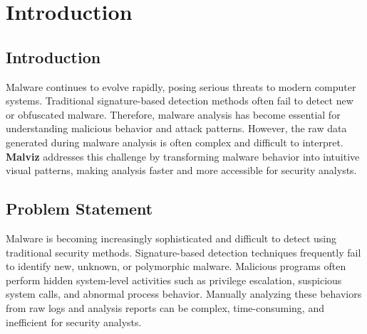 
\chapter{Introduction}\doublespacing %

\label{Chapter1} %


\section{Introduction}

\begin{frame}

Malware continues to evolve rapidly, posing serious threats to modern computer systems. 
Traditional signature-based detection methods often fail to detect new or obfuscated malware. 
Therefore, malware analysis has become essential for understanding malicious behavior and attack patterns. 
However, the raw data generated during malware analysis is often complex and difficult to interpret. 
\textbf{Malviz} addresses this challenge by transforming malware behavior into intuitive visual patterns, making analysis faster and more accessible for security analysts.

\end{frame}

\section{Problem Statement}

\begin{frame}

Malware is becoming increasingly sophisticated and difficult to detect using traditional security methods. 
Signature-based detection techniques frequently fail to identify new, unknown, or polymorphic malware. 
Malicious programs often perform hidden system-level activities such as privilege escalation, suspicious system calls, and abnormal process behavior. 
Manually analyzing these behaviors from raw logs and analysis reports can be complex, time-consuming, and inefficient for security analysts.

\end{frame}


